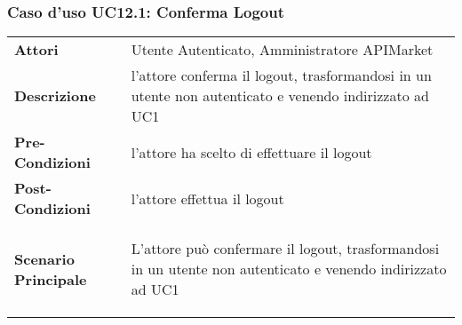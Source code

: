 \newpage
\subsubsection{Caso d'uso UC12.1: Conferma Logout}
\label{UC12.1}

\renewcommand*{\arraystretch}{1.6}
\begin{longtable}{ l | p{11cm}}
	\hline
	\rowcolor{Gray}
	\multicolumn{2}{c}{UC12.1: Conferma Logout} \\
	\hline
	\textbf{Attori} &Utente Autenticato, Amministratore APIMarket \\
	\textbf{Descrizione} & l'attore conferma il logout, trasformandosi in un utente non autenticato e venendo indirizzato ad UC1\\
	\textbf{Pre-Condizioni} & l'attore ha scelto di effettuare il logout\\
	\textbf{Post-Condizioni}&l'attore effettua il logout\\
	\textbf{Scenario Principale} & \begin{enumerate*}[label=(\arabic*.),itemjoin={\newline}]
		\item L'attore può confermare il logout, trasformandosi in un utente non autenticato e venendo indirizzato ad UC1
	\end{enumerate*}\\
\end{longtable}
